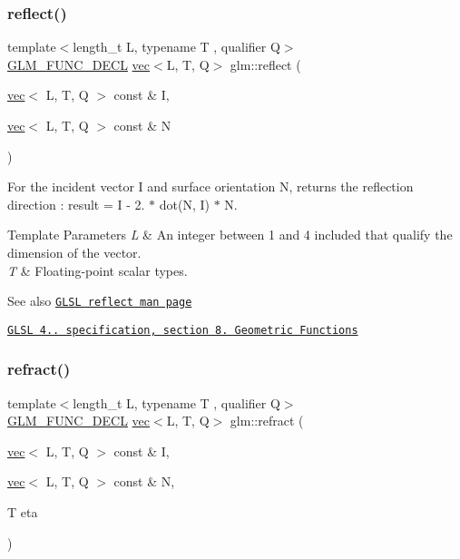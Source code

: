 \subsubsection{\texorpdfstring{reflect()}{reflect()}}
{\footnotesize\ttfamily template$<$length\+\_\+t L, typename T , qualifier Q$>$ \\
\hyperlink{setup_8hpp_ab2d052de21a70539923e9bcbf6e83a51}{G\+L\+M\+\_\+\+F\+U\+N\+C\+\_\+\+D\+E\+CL} \hyperlink{structglm_1_1vec}{vec}$<$L, T, Q$>$ glm\+::reflect (\begin{DoxyParamCaption}\item[{\hyperlink{structglm_1_1vec}{vec}$<$ L, T, Q $>$ const \&}]{I,  }\item[{\hyperlink{structglm_1_1vec}{vec}$<$ L, T, Q $>$ const \&}]{N }\end{DoxyParamCaption})}

For the incident vector I and surface orientation N, returns the reflection direction \+: result = I -\/ 2. $\ast$ dot(\+N, I) $\ast$ N.


\begin{DoxyTemplParams}{Template Parameters}
{\em L} & An integer between 1 and 4 included that qualify the dimension of the vector. \\
\hline
{\em T} & Floating-\/point scalar types.\\
\hline
\end{DoxyTemplParams}
\begin{DoxySeeAlso}{See also}
\href{http://www.opengl.org/sdk/docs/manglsl/xhtml/reflect.xml}{\tt G\+L\+SL reflect man page} 

\href{http://www.opengl.org/registry/doc/GLSLangSpec.4.20.8.pdf}{\tt G\+L\+SL 4.. specification, section 8. Geometric Functions} 
\end{DoxySeeAlso}
\mbox{\label{group__core__func__geometric_ga01da3dff9e2ef6b9d4915c3047e22b74}} 
\subsubsection{\texorpdfstring{refract()}{refract()}}
{\footnotesize\ttfamily template$<$length\+\_\+t L, typename T , qualifier Q$>$ \\
\hyperlink{setup_8hpp_ab2d052de21a70539923e9bcbf6e83a51}{G\+L\+M\+\_\+\+F\+U\+N\+C\+\_\+\+D\+E\+CL} \hyperlink{structglm_1_1vec}{vec}$<$L, T, Q$>$ glm\+::refract (\begin{DoxyParamCaption}\item[{\hyperlink{structglm_1_1vec}{vec}$<$ L, T, Q $>$ const \&}]{I,  }\item[{\hyperlink{structglm_1_1vec}{vec}$<$ L, T, Q $>$ const \&}]{N,  }\item[{T}]{eta }\end{DoxyParamCaption})}

